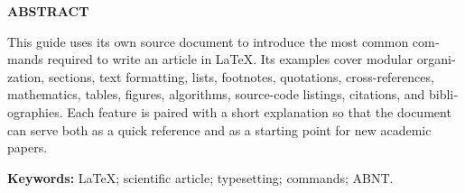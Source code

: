 \thispagestyle{empty}
\begin{otherlanguage}{english}
\begin{center}
  \textbf{ABSTRACT}
\end{center}

This guide uses its own source document to introduce the most common commands required to write an article in \LaTeX. Its examples cover modular organization, sections, text formatting, lists, footnotes, quotations, cross-references, mathematics, tables, figures, algorithms, source-code listings, citations, and bibliographies. Each feature is paired with a short explanation so that the document can serve both as a quick reference and as a starting point for new academic papers.

\begin{center}
  \textbf{Keywords:} \LaTeX; scientific article; typesetting; commands; ABNT.
\end{center}
\end{otherlanguage}
\newpage
